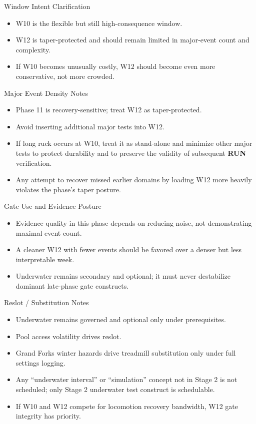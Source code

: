 \documentclass[10pt]{article}
\begin{document}
Window Intent Clarification

\begin{itemize}
\item W10 is the flexible but still high-consequence window.
\item W12 is taper-protected and should remain limited in major-event count and complexity.
\item If W10 becomes unusually costly, W12 should become even more conservative, not more crowded.
\end{itemize}

Major Event Density Notes

\begin{itemize}
\item Phase 11 is recovery-sensitive; treat W12 as taper-protected.
\item Avoid inserting additional major tests into W12.
\item If long ruck occurs at W10, treat it as stand-alone and minimize other major tests to protect durability and to preserve the validity of subsequent \textbf{RUN} verification.
\item Any attempt to recover missed earlier domains by loading W12 more heavily violates the phase’s taper posture.
\end{itemize}

Gate Use and Evidence Posture

\begin{itemize}
\item Evidence quality in this phase depends on reducing noise, not demonstrating maximal event count.
\item A cleaner W12 with fewer events should be favored over a denser but less interpretable week.
\item Underwater remains secondary and optional; it must never destabilize dominant late-phase gate constructs.
\end{itemize}

Reslot / Substitution Notes

\begin{itemize}
\item Underwater remains governed and optional only under prerequisites.
\item Pool access volatility drives reslot.
\item Grand Forks winter hazards drive treadmill substitution only under full settings logging.
\item Any “underwater interval” or “simulation” concept not in Stage 2 is not scheduled; only Stage 2 underwater test construct is schedulable.
\item If W10 and W12 compete for locomotion recovery bandwidth, W12 gate integrity has priority.
\end{itemize}
\end{document}
